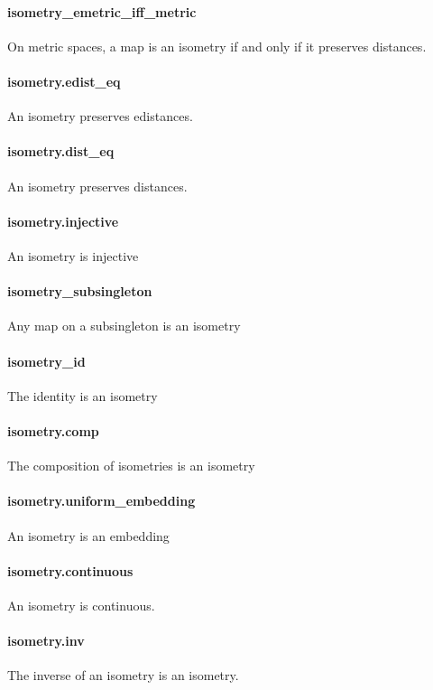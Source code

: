 \documentclass{article}
\begin{document}
\paragraph{isometry\_emetric\_iff\_metric}
\par
On metric spaces, a map is an isometry if and only if it preserves distances.
\paragraph{isometry.edist\_eq}
\par
An isometry preserves edistances.
\paragraph{isometry.dist\_eq}
\par
An isometry preserves distances.
\paragraph{isometry.injective}
\par
An isometry is injective
\paragraph{isometry\_subsingleton}
\par
Any map on a subsingleton is an isometry
\paragraph{isometry\_id}
\par
The identity is an isometry
\paragraph{isometry.comp}
\par
The composition of isometries is an isometry
\paragraph{isometry.uniform\_embedding}
\par
An isometry is an embedding
\paragraph{isometry.continuous}
\par
An isometry is continuous.
\paragraph{isometry.inv}
\par
The inverse of an isometry is an isometry.
\end{document}
